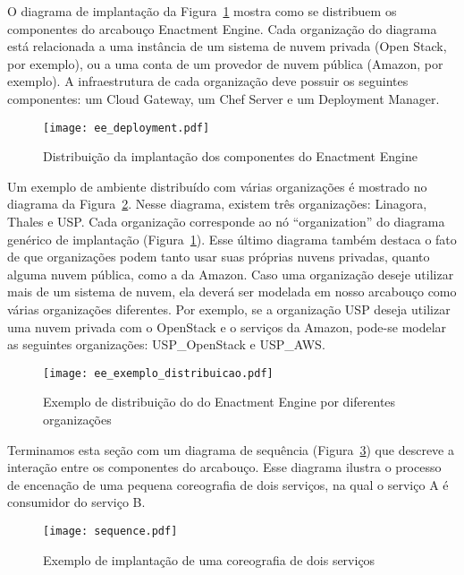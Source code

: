 O diagrama de implantação da Figura~\ref{fig:ee_distribuicao} mostra como se distribuem os componentes do arcabouço Enactment Engine. Cada organização do diagrama está relacionada a uma instância de um sistema de nuvem privada (Open Stack, por exemplo), ou a uma conta de um provedor de nuvem pública (Amazon, por exemplo). A infraestrutura de cada organização deve possuir os seguintes componentes: um Cloud Gateway, um Chef Server e um Deployment Manager. 

\begin{figure}[!h]
  \centering
  \texttt{[image: ee\_deployment.pdf]} 
  \caption{Distribuição da implantação dos componentes do Enactment Engine}
  \label{fig:ee_distribuicao} 
\end{figure}

Um exemplo de ambiente distribuído com várias organizações é mostrado no diagrama da Figura~\ref{fig:ee_exemplo_distribuicao}. Nesse diagrama, existem três organizações: Linagora, Thales e USP. Cada organização corresponde ao nó ``organization'' do diagrama genérico de implantação (Figura~\ref{fig:ee_distribuicao}). Esse último diagrama também destaca o fato de que organizações podem tanto usar suas próprias nuvens privadas, quanto alguma nuvem pública, como a da Amazon. Caso uma organização deseje utilizar mais de um sistema de nuvem, ela deverá ser modelada em nosso arcabouço como várias organizações diferentes. Por exemplo, se a organização USP deseja utilizar uma nuvem privada com o OpenStack e o serviços da Amazon, pode-se modelar as seguintes organizações: USP\_OpenStack e USP\_AWS.

\begin{figure}[!h]
  \centering
  \texttt{[image: ee\_exemplo\_distribuicao.pdf]} 
  \caption{Exemplo de distribuição do do Enactment Engine por diferentes organizações}
  \label{fig:ee_exemplo_distribuicao} 
\end{figure}

Terminamos esta seção com um diagrama de sequência (Figura~\ref{fig:ee_sequencia}) que descreve a interação entre os componentes do arcabouço. Esse diagrama ilustra o processo de encenação de uma pequena coreografia de dois serviços, na qual o serviço A é consumidor do serviço B.

\begin{figure}[!h]
  \centering
  \texttt{[image: sequence.pdf]} 
  \caption{Exemplo de implantação de uma coreografia de dois serviços}
  \label{fig:ee_sequencia} 
\end{figure}

